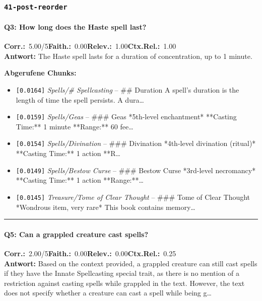 \subsubsection*{\texttt{41-post-reorder}}
\label{app:samples:41_post_reorder}

\paragraph{Q3: How long does the Haste spell last?}
\noindent \textbf{Corr.:}~5.00/5\quad \textbf{Faith.:}~0.00\quad \textbf{Relev.:}~1.00\quad \textbf{Ctx.Rel.:}~1.00\\

\noindent\textbf{Antwort:} The Haste spell lasts for a duration of concentration, up to 1 minute.

\noindent\textbf{Abgerufene Chunks:}
\begin{itemize}[noitemsep, topsep=2pt]
  \item[\textbf{\#1}] \texttt{[0.0164]} \textit{Spells/# Spellcasting} -- \#\# Duration  A spell's duration is the length of time the spell persists. A dura\ldots
  \item[\textbf{\#2}] \texttt{[0.0159]} \textit{Spells/Geas} -- \#\#\# Geas  *5th-level enchantment*  **Casting Time:** 1 minute  **Range:** 60 fee\ldots
  \item[\textbf{\#3}] \texttt{[0.0154]} \textit{Spells/Divination} -- \#\#\# Divination  *4th-level divination (ritual)*  **Casting Time:** 1 action  **R\ldots
  \item[\textbf{\#4}] \texttt{[0.0149]} \textit{Spells/Bestow Curse} -- \#\#\# Bestow Curse  *3rd-level necromancy*  **Casting Time:** 1 action  **Range:**\ldots
  \item[\textbf{\#5}] \texttt{[0.0145]} \textit{Treasure/Tome of Clear Thought} -- \#\#\# Tome of Clear Thought  *Wondrous item, very rare*  This book contains memory\ldots
\end{itemize}
\vspace{4pt}
\hrule
\vspace{6pt}

\paragraph{Q5: Can a grappled creature cast spells?}
\noindent \textbf{Corr.:}~2.00/5\quad \textbf{Faith.:}~0.00\quad \textbf{Relev.:}~0.00\quad \textbf{Ctx.Rel.:}~0.25\\

\noindent\textbf{Antwort:} Based on the context provided, a grappled creature can still cast spells if they have the Innate Spellcasting special trait, as there is no mention of a restriction against casting spells while grappled in the text. However, the text does not specify whether a creature can cast a spell while being g\ldots

